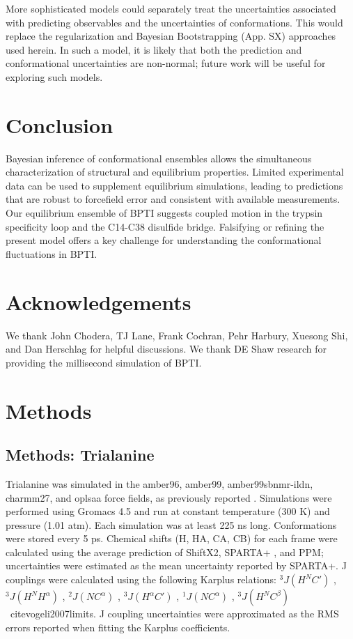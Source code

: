 \documentclass[journal=jacsat,manuscript=article]{achemso}
\begin{document}
More sophisticated models could separately treat the uncertainties associated with predicting observables and the uncertainties of conformations.  This would replace the regularization and Bayesian Bootstrapping (App. SX) approaches used herein.  In such a model, it is likely that both the prediction and conformational uncertainties are non-normal; future work will be useful for exploring such models.  


\section{Conclusion}

Bayesian inference of conformational ensembles allows the simultaneous characterization of structural and equilibrium properties.  Limited experimental data can be used to supplement equilibrium simulations, leading to predictions that are robust to forcefield error and consistent with available measurements.  Our equilibrium ensemble of BPTI suggests coupled motion in the trypsin specificity loop and the C14-C38 disulfide bridge.  Falsifying or refining the present model offers a key challenge for understanding the conformational fluctuations in BPTI.

\section{Acknowledgements}

We thank John Chodera, TJ Lane, Frank Cochran, Pehr Harbury, Xuesong Shi, and Dan Herschlag for helpful discussions.  We thank DE Shaw research for providing the millisecond simulation of BPTI.  

\section{Methods}

\subsection{Methods: Trialanine}

Trialanine was simulated in the amber96\cite{kollman1996}, amber99\cite{wang2000}, amber99sbnmr-ildn\cite{li2010}, charmm27\cite{mackerell2004extending,bjelkmar2010implementation}, and oplsaa\cite{kaminski2001evaluation} force fields, as previously reported \cite{beauchamp2012protein}.  Simulations were performed using Gromacs 4.5 \cite{hess2008} and run at constant temperature (300 K) and pressure (1.01 atm).  Each simulation was at least 225 ns long.  Conformations were stored every 5 ps.  Chemical shifts (H, HA, CA, CB) for each frame were calculated using the average prediction of ShiftX2\cite{han2011shiftx2}, SPARTA+ \cite{Shen2010}, and PPM\cite{li2012ppm}; uncertainties were estimated as the mean uncertainty reported by SPARTA+. J couplings were calculated using the following Karplus relations: $^3J(H^N C')$ \cite{Schmidt1999}, $^3J(H^N H^\alpha)$ \cite{vogeli2007limits}, $^2J(N C^\alpha)$ \cite{Graf2007}, $^3J(H^\alpha C')$ \cite{Schmidt1999}, $^1J(N C^\alpha)$ \cite{Graf2007}, $^3J(H^N C^\beta)$ \
cite{vogeli2007limits}.  J coupling uncertainties were approximated as the RMS errors reported when fitting the Karplus coefficients.  



\end{document}
